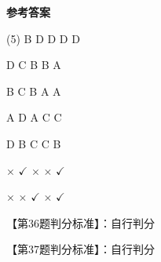 \documentclass[11pt, a4paper]{article}
\begin{document}
\begin{center}
    \Huge \textbf{参考答案}
\end{center}

    \begin{tasks}[label=\arabic*. , label-width=14pt](5)
        \task B
        \task D
        \task D
        \task D
        \task D

        \task D
        \task C
        \task B
        \task B
        \task A

        \task B
        \task C
        \task B
        \task A
        \task A

        \task A
        \task D
        \task A
        \task C
        \task C

        \task D
        \task B
        \task C
        \task C
        \task B

        \task $\times$
        \task $\checkmark$
        \task $\times$
        \task $\times$
        \task $\checkmark$

        \task $\times$
        \task $\times$
        \task $\checkmark$
        \task $\times$
        \task $\checkmark$
    \end{tasks}

    【第36题判分标准】：自行判分

    【第37题判分标准】：自行判分
\end{document}
